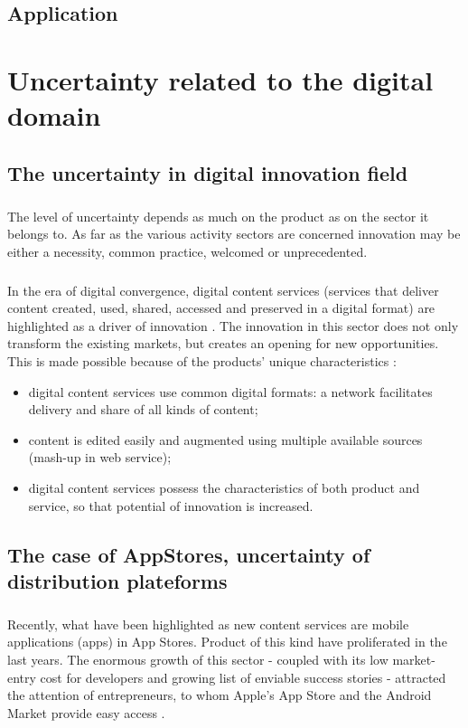 \documentclass[twoside]{report}
\begin{document}
	\section{Application}
	



	\chapter{Uncertainty related to the digital domain}
	\label{ch:kinds}
	\section{The uncertainty in digital innovation field}
	\paragraph{}
	The level of uncertainty depends as much on the product as on the sector it belongs to. As far as the various activity sectors are concerned innovation may be either a necessity, common practice, welcomed or unprecedented.
	\paragraph{}
	In the era of digital convergence, digital content services (services that deliver content created, used, shared, accessed and preserved in a digital format) are highlighted as a driver of innovation \cite{toivonen_innovation_2007, gwee_innovation_2009}. The innovation in this sector does not only transform the existing markets, but creates an opening for new opportunities. This is made possible because of the products' unique characteristics \cite{kim_patterns_2012}:
	\begin{itemize}
		\item digital content services use common digital formats: a network facilitates delivery and share of all kinds of content;
		\item content is edited easily and augmented using multiple available sources (mash-up in web service);
		\item digital content services possess the characteristics of both product and service, so that potential of innovation is increased.
	\end{itemize}
	\section{The case of AppStores, uncertainty of distribution plateforms}
	\paragraph{}
	Recently, what have been highlighted as new content services are mobile applications (apps) in App Stores. Product of this kind have proliferated in the last years. The enormous growth of this sector - coupled with its low market-entry cost for developers and growing list of enviable success stories - attracted the attention of entrepreneurs, to whom Apple's App Store and the Android Market provide easy access \cite{wacheski_anystone_2011}.
\end{document}
